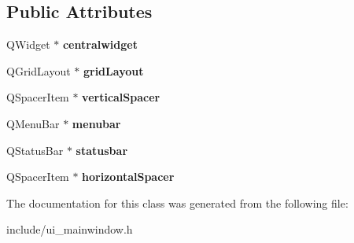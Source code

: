 \subsection*{Public Attributes}
\begin{DoxyCompactItemize}
\item 
\hypertarget{class_ui___main_window_a39420100bfee3ba57f137af5a3b0f8e9}{Q\-Widget $\ast$ {\bfseries centralwidget}}\label{class_ui___main_window_a39420100bfee3ba57f137af5a3b0f8e9}

\item 
\hypertarget{class_ui___main_window_ac4586abe48f0aabf940b0dc2df3772ed}{Q\-Grid\-Layout $\ast$ {\bfseries grid\-Layout}}\label{class_ui___main_window_ac4586abe48f0aabf940b0dc2df3772ed}

\item 
\hypertarget{class_ui___main_window_a8384329c3663ff274e926a12024aab52}{Q\-Spacer\-Item $\ast$ {\bfseries vertical\-Spacer}}\label{class_ui___main_window_a8384329c3663ff274e926a12024aab52}

\item 
\hypertarget{class_ui___main_window_a734b1d3bb71c1b8e1ea01b7fa4344fce}{Q\-Menu\-Bar $\ast$ {\bfseries menubar}}\label{class_ui___main_window_a734b1d3bb71c1b8e1ea01b7fa4344fce}

\item 
\hypertarget{class_ui___main_window_a07519bbb9a350befd6feb4e84ef299fd}{Q\-Status\-Bar $\ast$ {\bfseries statusbar}}\label{class_ui___main_window_a07519bbb9a350befd6feb4e84ef299fd}

\item 
\hypertarget{class_ui___main_window_a7871ea8c4b6c595d7ccd53960b344719}{Q\-Spacer\-Item $\ast$ {\bfseries horizontal\-Spacer}}\label{class_ui___main_window_a7871ea8c4b6c595d7ccd53960b344719}

\end{DoxyCompactItemize}


The documentation for this class was generated from the following file\-:\begin{DoxyCompactItemize}
\item 
include/ui\-\_\-mainwindow.\-h\end{DoxyCompactItemize}
